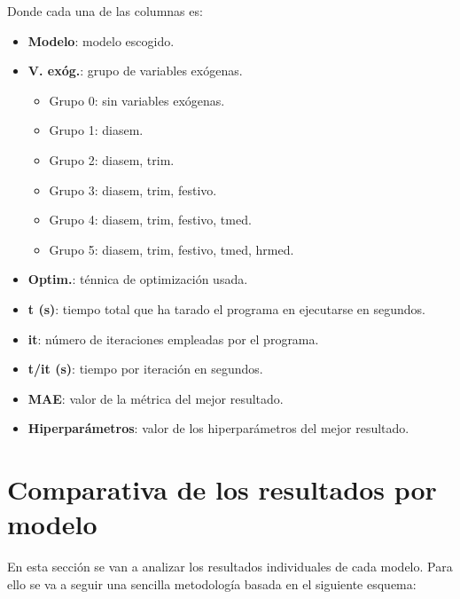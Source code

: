 \documentclass[12pt,a4paper]{report}
\begin{document}
Donde cada una de las columnas es:

\begin{itemize}
    \item \textbf{Modelo}: modelo escogido.

    \item \textbf{V. exóg.}: grupo de variables exógenas.
    \begin{itemize}
        \item Grupo 0: sin variables exógenas.
        \item Grupo 1: diasem.
        \item Grupo 2: diasem, trim.
        \item Grupo 3: diasem, trim, festivo.
        \item Grupo 4: diasem, trim, festivo, tmed.
        \item Grupo 5: diasem, trim, festivo, tmed, hrmed.
    \end{itemize}

    \item \textbf{Optim.}: ténnica de optimización usada.

    \item \textbf{t (s)}: tiempo total que ha tarado el programa en ejecutarse en segundos.

    \item \textbf{it}: número de iteraciones empleadas por el programa.

    \item \textbf{t/it (s)}: tiempo por iteración en segundos.

    \item \textbf{MAE}: valor de la métrica del mejor resultado.

    \item \textbf{Hiperparámetros}: valor de los hiperparámetros del mejor resultado.
\end{itemize}

\section{Comparativa de los resultados por modelo}

En esta sección se van a analizar los resultados individuales de cada modelo. Para ello se va a seguir una sencilla metodología basada en el siguiente esquema:
\end{document}
